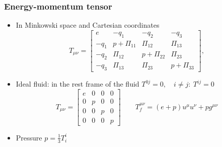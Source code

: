\begin{frame}
    \frametitle{Energy-momentum tensor}
    \begin{itemize}
        \item In Minkowski space and Cartesian coordinates
        \begin{equation}
        T_{\mu \nu} =
        \begin{bmatrix}
        e & -q_1 & -q_2 & -q_3 \\
        -q_1 & p + \Pi_{11} & \Pi_{12} & \Pi_{13} \\
        -q_2 & \Pi_{12} & p + \Pi_{22} & \Pi_{23} \\
        -q_3 & \Pi_{13} & \Pi_{23} & p + \Pi_{33}
        \end{bmatrix},
        \label{eq:ep_tensor_general_matrix}
        \end{equation}
        \item Ideal fluid: in the rest frame of the fluid $T^{0j} = 0, \quad i \neq j: \ T^{ij} = 0$
        \begin{equation}
        T_{\mu \nu} =
        \begin{bmatrix}
        e & 0 & 0 & 0 \\
        0 & p & 0 & 0 \\
        0 & 0 & p & 0 \\
        0 & 0 & 0 & p
        \end{bmatrix}
        \quad \quad
        T^{\mu \nu}_f = (e+p) u^\mu u^\nu + p g^{\mu \nu}
        \end{equation}
        \item Pressure $p = \frac{1}{3} T^i_i$
    \end{itemize}
\end{frame}

